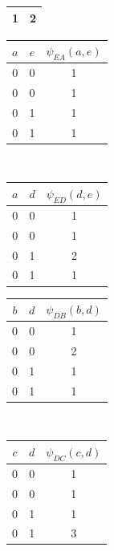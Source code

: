 \documentclass[11pt,addpoints,answers]{exam}
\numberwithin{equation}{section} %
\numberwithin{figure}{section} %
\numberwithin{table}{section} %
\begin{document}
\begin{minipage}{.6\textwidth}
\begin{table}[H]
\begin{subtable}[t]{0.3\textwidth}
\begin{tabular}{cc}
        1 & 2 \\ 
        \bottomrule
    \end{tabular}
\end{subtable}
\end{table}
\begin{table}[H]
    \centering
    \begin{subtable}[t]{0.35\textwidth}
    \centering
    \begin{tabular}{ccc} 
        \toprule
        $a$ & $e$ & $\psi_{EA}(a,e)$ \\
        \midrule
        0 & 0 & 1 \\
        0 & 0 & 1 \\
        0 & 1 & 1 \\
        0 & 1 & 1 \\
        \bottomrule
    \end{tabular}
\end{subtable}
~
    \begin{subtable}[t]{0.35\textwidth}
    \centering
    \begin{tabular}{ccc} 
        \toprule
        $a$ & $d$ & $\psi_{ED}(d,e)$ \\
        \midrule
        0 & 0 & 1 \\
        0 & 0 & 1 \\
        0 & 1 & 2 \\
        0 & 1 & 1 \\
        \bottomrule
    \end{tabular}
\end{subtable}
\end{table}
\begin{table}[H]
    \centering
    \begin{subtable}[t]{0.35\textwidth}
    \centering
    \begin{tabular}{ccc} 
        \toprule
        $b$ & $d$ & $\psi_{DB}(b,d)$ \\
        \midrule
        0 & 0 & 1 \\
        0 & 0 & 2 \\
        0 & 1 & 1 \\
        0 & 1 & 1 \\
        \bottomrule
    \end{tabular}
\end{subtable}
~
    \begin{subtable}[t]{0.35\textwidth}
    \centering
    \begin{tabular}{ccc} 
        \toprule
        $c$ & $d$ & $\psi_{DC}(c,d)$ \\
        \midrule
        0 & 0 & 1 \\
        0 & 0 & 1 \\
        0 & 1 & 1 \\
        0 & 1 & 3 \\
        \bottomrule
    \end{tabular}
\end{subtable}
\end{table}

\end{minipage}
\end{document}
